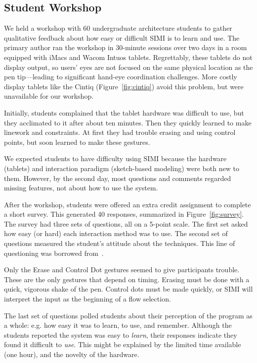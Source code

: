 \documentclass{article}
\begin{document}
\subsection{Student Workshop}

We held a workshop with 60 undergraduate architecture students to
gather qualitative feedback about how easy or difficult SIMI is to
learn and use. The primary author ran the workshop in 30-minute
sessions over two days in a room equipped with iMacs and Wacom Intuos
tablets. Regrettably, these tablets do not display output, so users'
eyes are not focused on the same physical location as the pen
tip---leading to significant hand-eye coordination challenges. More
costly display tablets like the Cintiq (Figure~\ref{fig:cintiq}) avoid
this problem, but were unavailable for our workshop.

Initially, students complained that the tablet hardware was difficult
to use, but they acclimated to it after about ten minutes. Then they
quickly learned to make linework and constraints. At first they had
trouble erasing and using control points, but soon learned to make
these gestures.

We expected students to have difficulty using SIMI because the
hardware (tablets) and interaction paradigm (sketch-based modeling)
were both new to them. However, by the second day, most questions and
comments regarded missing features, not about how to use the system.

After the workshop, students were offered an extra credit assignment
to complete a short survey. This generated 40 responses, summarized in
Figure~\ref{fig:survey}. The survey had three sets of questions, all
on a 5-point scale. The first set asked how easy (or hard) each
interaction method was to use. The second set of questions measured
the student's attitude about the techniques. This line of questioning
was borrowed from~\cite{bae-everybody}.

Only the Erase and Control Dot gestures seemed to give participants
trouble. These are the only gestures that depend on timing. Erasing
must be done with a quick, vigorous shake of the pen. Control dots
must be made quickly, or SIMI will interpret the input as the
beginning of a flow selection.

The last set of questions polled students about their perception of
the program as a whole: e.g. how easy it was to learn, to use, and
remember. Although the students reported the system was easy to
\textit{learn}, their responses indicate they found it difficult to
\textit{use}. This might be explained by the limited time available
(one hour), and the novelty of the hardware.
\end{document}
